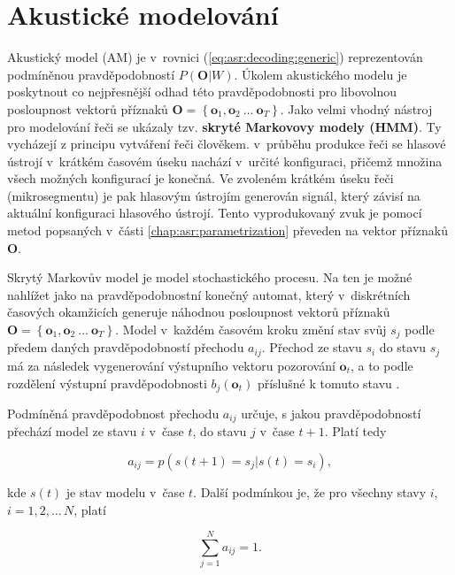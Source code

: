 \section{Akustické modelování}
\label{chap:asr:acoustic}

Akustický model (AM) je v~rovnici (\ref{eq:asr:decoding:generic}) reprezentován podmíněnou pravděpodobností $P(\boldsymbol{O}|W)$. Úkolem akustického modelu je poskytnout co nejpřesnější odhad této pravděpodobnosti pro libovolnou posloupnost vektorů příznaků $\boldsymbol{O} = \left\{\boldsymbol{o}_1, \boldsymbol{o}_2\ \dots\ \boldsymbol{o}_T\right\}$. Jako velmi vhodný nástroj pro modelování řeči se ukázaly tzv. \textbf{skryté Markovovy modely (HMM)}. Ty vycházejí z principu vytváření řeči člověkem. v~průběhu produkce řeči se hlasové ústrojí v~krátkém časovém úseku nachází v~určité konfiguraci, přičemž množina všech možných konfigurací je konečná. Ve zvoleném krátkém úseku řeči (mikrosegmentu) je pak hlasovým ústrojím generován signál, který závisí na aktuální konfiguraci hlasového ústrojí. Tento vyprodukovaný zvuk je pomocí metod popsaných v~části \ref{chap:asr:parametrization} převeden na vektor příznaků $\boldsymbol{O}$.

Skrytý Markovův model je model stochastického procesu. Na ten je možné nahlížet jako na pravděpodobnostní konečný automat, který v~diskrétních časových okamžicích generuje náhodnou posloupnost vektorů příznaků $\boldsymbol{O} = \left\{\boldsymbol{o}_1, \boldsymbol{o}_2\ \dots\ \boldsymbol{o}_T\right\}$. Model v~každém časovém kroku změní stav svůj $s_j$ podle předem daných pravděpodobností přechodu $a_{ij}$. Přechod ze stavu $s_i$ do stavu $s_j$ má za následek vygenerování výstupního vektoru pozorování $\boldsymbol{o}_t$, a to podle rozdělení výstupní pravděpodobnosti $b_j\left(\boldsymbol{o}_t\right)$ příslušné k tomuto stavu \cite{Psutka2006}.

Podmíněná pravděpodobnost přechodu $a_{ij}$ určuje, s jakou pravděpodobností přechází model ze stavu $i$ v~čase $t$, do stavu $j$ v~čase $t+1$. Platí tedy

\begin{equation}
  a_{ij} = p\left(s\left(t+1\right)=s_j|s\left(t\right)=s_i\right),
  \label{eq:asr:acoustic:conditional}
\end{equation}

\noindent kde $s\left(t\right)$ je stav modelu v~čase $t$. Další podmínkou je, že pro všechny stavy $i$, $i=1,2,\dots\,N$, platí

\begin{equation}
  \sum_{j=1}^{N} a_{ij} = 1.
  \label{eq:asr:acoustic:state:condition}
\end{equation}

